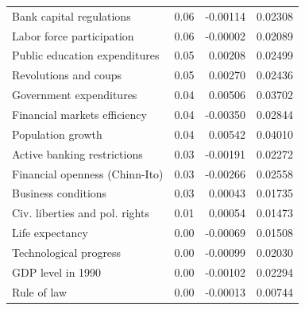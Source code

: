 \begin{refsection}
\begin{subappendices}
\begin{table}[!ht]
\begin{tabular}{lrrr}
      Bank capital regulations & 0.06 & -0.00114 & 0.02308 \\ 
      Labor force participation & 0.06 & -0.00002 & 0.02089 \\ 
      Public education expenditures & 0.05 & 0.00208 & 0.02499 \\ 
      Revolutions and coups & 0.05 & 0.00270 & 0.02436 \\ 
      Government expenditures & 0.04 & 0.00506 & 0.03702 \\ 
      Financial markets efficiency & 0.04 & -0.00350 & 0.02844 \\ 
      Population growth & 0.04 & 0.00542 & 0.04010 \\ 
      Active banking restrictions & 0.03 & -0.00191 & 0.02272 \\ 
      Financial openness (Chinn-Ito) & 0.03 & -0.00266 & 0.02558 \\ 
      Business conditions & 0.03 & 0.00043 & 0.01735 \\ 
      Civ. liberties and pol. rights & 0.01 & 0.00054 & 0.01473 \\ 
      Life expectancy & 0.00 & -0.00069 & 0.01508 \\ 
      Technological progress & 0.00 & -0.00099 & 0.02030 \\ 
      GDP level in 1990 & 0.00 & -0.00102 & 0.02294 \\ 
      Rule of law & 0.00 & -0.00013 & 0.00744 \\
      \midrule
      \bottomrule
    \end{tabular}
    \end{table}
    
    \clearpage
    

\end{subappendices}
\end{refsection}
